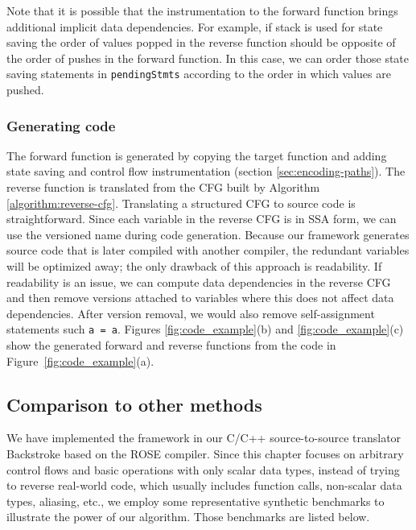 Note that it is possible that the instrumentation to the forward function brings additional implicit data dependencies. 
For example, if stack is used for state saving the order of values popped in the reverse function should be opposite of the order of pushes in the forward function. 
In this case, we can order those state saving statements in \texttt{pendingStmts} according to the order in which values are pushed.


\subsubsection{Generating code} 
The forward function is generated by copying the target function and adding state saving and control flow instrumentation (section \ref{sec:encoding-paths}). 
The reverse function is translated from the CFG built by Algorithm \ref{algorithm:reverse-cfg}. 
Translating a structured CFG to source code is straightforward. 
Since each variable in the reverse CFG is in SSA form, we can use the versioned name during code generation. 
Because our framework generates source code that is later compiled with another compiler, the redundant variables will be optimized away; the only drawback of this approach is readability.
If readability is an issue, we can compute data dependencies in the reverse CFG and then remove versions attached to variables where this does not affect data dependencies.
After version removal, we would also remove self-assignment statements such \texttt{a = a}.
Figures \ref{fig:code_example}(b) and \ref{fig:code_example}(c) show the generated forward and reverse functions from the code in Figure~\ref{fig:code_example}(a).



\subsection{Comparison to other methods}

We have implemented the framework in our C/C++ source-to-source translator Backstroke based on the ROSE compiler. 
Since this chapter focuses on arbitrary control flows and basic operations with only scalar data types, instead of trying to reverse real-world code, which usually includes function calls, non-scalar data types, aliasing, etc., we employ some representative synthetic benchmarks to illustrate the power of our algorithm. Those benchmarks are listed below.

\newcommand{\NoBranch}{\textbf{NoBranch}\xspace}
\newcommand{\Branchesa}{\textbf{Branches1}\xspace}
\newcommand{\Branchesb}{\textbf{Branches2}\xspace}
\newcommand{\Branchesc}{\textbf{Branches3}\xspace}
\newcommand{\Loopa}{\textbf{Loop1}\xspace}
\newcommand{\Loopb}{\textbf{Loop2}\xspace}
\newcommand{\Asn}{\textbf{Assignment}\xspace}
\newcommand{\Inc}{\textbf{Increment}\xspace}
\newcommand{\CSS}{\textbf{CSS}\xspace}
\newcommand{\ISS}{\textbf{ISS}\xspace}
\newcommand{\RCC}{\textbf{RCC}\xspace}

